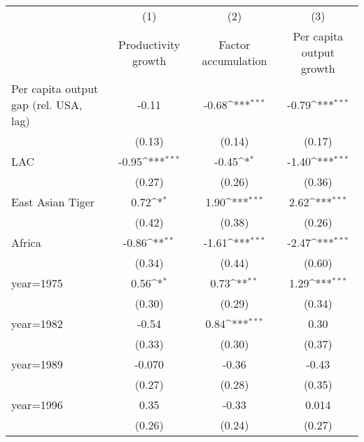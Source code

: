 {
\def\sym#1{\ifmmode^{#1}\else\(^{#1}\)\fi}
\begin{tabular}{l*{3}{c}}
\toprule
                    &\multicolumn{1}{c}{(1)}&\multicolumn{1}{c}{(2)}&\multicolumn{1}{c}{(3)}\\
                    &\multicolumn{1}{c}{Productivity growth}&\multicolumn{1}{c}{Factor accumulation}&\multicolumn{1}{c}{Per capita output growth}\\
\midrule
Per capita output gap (rel. USA, lag)&       -0.11         &       -0.68\sym{***}&       -0.79\sym{***}\\
                    &      (0.13)         &      (0.14)         &      (0.17)         \\
\addlinespace
LAC                 &       -0.95\sym{***}&       -0.45\sym{*}  &       -1.40\sym{***}\\
                    &      (0.27)         &      (0.26)         &      (0.36)         \\
\addlinespace
East Asian Tiger    &        0.72\sym{*}  &        1.90\sym{***}&        2.62\sym{***}\\
                    &      (0.42)         &      (0.38)         &      (0.26)         \\
\addlinespace
Africa              &       -0.86\sym{**} &       -1.61\sym{***}&       -2.47\sym{***}\\
                    &      (0.34)         &      (0.44)         &      (0.60)         \\
\addlinespace
year=1975           &        0.56\sym{*}  &        0.73\sym{**} &        1.29\sym{***}\\
                    &      (0.30)         &      (0.29)         &      (0.34)         \\
\addlinespace
year=1982           &       -0.54         &        0.84\sym{***}&        0.30         \\
                    &      (0.33)         &      (0.30)         &      (0.37)         \\
\addlinespace
year=1989           &      -0.070         &       -0.36         &       -0.43         \\
                    &      (0.27)         &      (0.28)         &      (0.35)         \\
\addlinespace
year=1996           &        0.35         &       -0.33         &       0.014         \\
                    &      (0.26)         &      (0.24)         &      (0.27)         \\

\end{tabular}}
